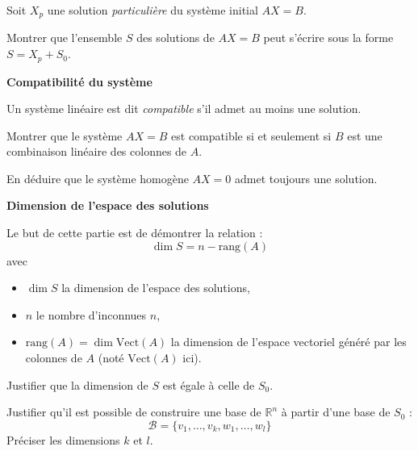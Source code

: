 \documentclass[10pt,a4paper]{article}
\begin{document}
\bigskip
Soit $X_p$ une solution \textit{particulière} du système initial $AX = B$.

\q Montrer que l'ensemble $S$ des solutions de $AX = B$ peut s'écrire sous la forme $S = X_p + S_0$.

\bigskip
\textbf{Compatibilité du système}

Un système linéaire est dit \textit{compatible} s'il admet au moins une solution.

\q Montrer que le système $AX = B$ est compatible si et seulement si $B$ est une combinaison
linéaire des colonnes de $A$.

\q En déduire que le système homogène $AX = 0$ admet toujours une solution.

\bigskip
\textbf{Dimension de l'espace des solutions}

Le but de cette partie est de démontrer la relation :
$$ \dim S = n - \text{rang}(A) $$
avec
\begin{itemize}
    \item $\dim S$ la dimension de l'espace des solutions,
    \item $n$ le nombre d'inconnues $n$,
    \item $\text{rang}(A) = \dim \text{Vect}(A)$ la dimension de l'espace vectoriel généré par les
    colonnes de $A$ (noté $\text{Vect}(A)$ ici).
\end{itemize}

\q Justifier que la dimension de $S$ est égale à celle de $S_0$.

\q Justifier qu'il est possible de construire une base de $\mathbb{R}^n$ à partir d'une base de
$S_0$ :
$$ \mathcal{B} = \{v_1, \ldots, v_k, w_1, \ldots, w_{l}\} $$
Préciser les dimensions $k$ et $l$.
\end{document}
